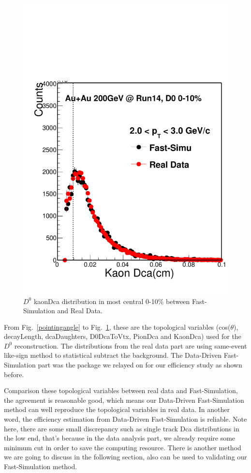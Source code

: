 \begin{figure}[htbp]
\begin{minipage}[htbp]{0.52\linewidth}
\includegraphics[width=1.0\textwidth,angle=0]{figure/Run14_D0HFT/kaonDca.pdf} 
\caption{ $D^0$ kaonDca distribution in most central 0-10\% between Fast-Simulation and Real Data. \label{kaonDca}}
\end{minipage}
\end{figure}

From Fig.~\ref{pointingangle} to Fig.~\ref{kaonDca}, these are the topological variables (cos($\theta$), decayLength, dcaDaughters, D0DcaToVtx, PionDca and KaonDca) used for the $D^0$ reconstruction. The distributions from the real data part are using same-event like-sign method to statistical subtract the background. The Data-Driven Fast-Simulation part was the package we relayed on for our efficiency study as shown before.

Comparison these topological variables between real data and Fast-Simulation, the agreement is reasonable good, which means our Data-Driven Fast-Simulation method can well reproduce the topological variables in real data. In another word, the efficiency estimation from Data-Driven Fast-Simulation is reliable. Note here, there are some small discrepancy such as single track Dca distributions in the low end, that's because in the data analysis part, we already require some minimum cut in order to save the computing resource. There is another method we are going to discuss in the following section, also can be used to validating our Fast-Simulation method.

